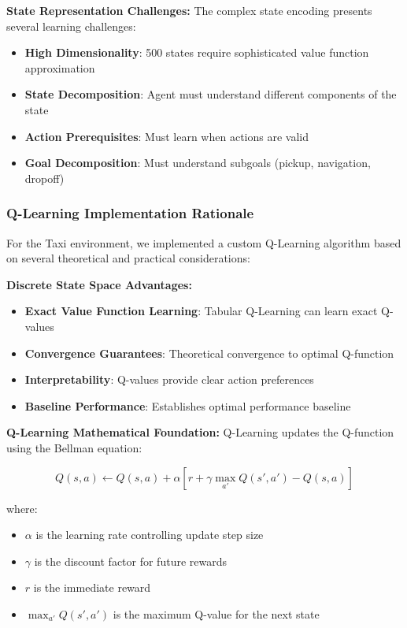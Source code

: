 \documentclass[12pt]{article}
\begin{document}
{{{\textbf{State Representation Challenges:}
The complex state encoding presents several learning challenges:

\begin{itemize}
    \item \textbf{High Dimensionality}: 500 states require sophisticated value function approximation
    \item \textbf{State Decomposition}: Agent must understand different components of the state
    \item \textbf{Action Prerequisites}: Must learn when actions are valid
    \item \textbf{Goal Decomposition}: Must understand subgoals (pickup, navigation, dropoff)
\end{itemize}

\subsubsection{Q-Learning Implementation Rationale}

For the Taxi environment, we implemented a custom Q-Learning algorithm based on several theoretical and practical considerations:

\textbf{Discrete State Space Advantages:}
\begin{itemize}
    \item \textbf{Exact Value Function Learning}: Tabular Q-Learning can learn exact Q-values
    \item \textbf{Convergence Guarantees}: Theoretical convergence to optimal Q-function
    \item \textbf{Interpretability}: Q-values provide clear action preferences
    \item \textbf{Baseline Performance}: Establishes optimal performance baseline
\end{itemize}

\textbf{Q-Learning Mathematical Foundation:}
Q-Learning updates the Q-function using the Bellman equation:

\begin{equation}
Q(s,a) \leftarrow Q(s,a) + \alpha \left[r + \gamma \max_{a'} Q(s',a') - Q(s,a)\right]
\end{equation}

where:
\begin{itemize}
    \item $\alpha$ is the learning rate controlling update step size
    \item $\gamma$ is the discount factor for future rewards
    \item $r$ is the immediate reward
    \item $\max_{a'} Q(s',a')$ is the maximum Q-value for the next state
\end{itemize}

}}}
\end{document}
